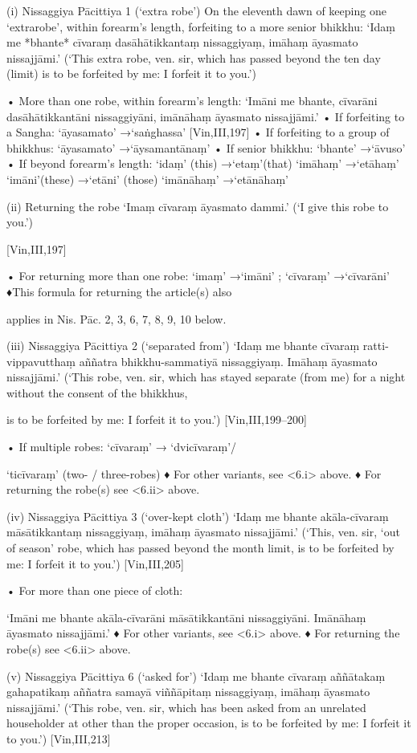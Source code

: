 (i) Nissaggiya Pācittiya 1 (‘extra robe’)
On the eleventh dawn of keeping one ‘extrarobe’, within forearm’s length, forfeiting to a
more senior bhikkhu:
‘Idaṃ me *bhante* cīvaraṃ dasāhātikkantaṃ
nissaggiyaṃ, imāhaṃ āyasmato nissajjāmi.’
(‘This extra robe, ven. sir, which has passed beyond the
ten day (limit) is to be forfeited by me: I forfeit it to you.’)

• More than one robe, within forearm’s
length:
‘Imāni me bhante, cīvarāni dasāhātikkantāni
nissaggiyāni, imānāhaṃ āyasmato nissajjāmi.’
• If forfeiting to a Sangha:
‘āyasamato’ →‘saṅghassa’ [Vin,III,197]
• If forfeiting to a group of bhikkhus:
‘āyasamato’ →‘āysamantānaṃ’
• If senior bhikkhu: ‘bhante’ →‘āvuso’
• If beyond forearm’s length:
‘idaṃ’ (this) →‘etaṃ’(that)
‘imāhaṃ’ →‘etāhaṃ’
‘imāni’(these) →‘etāni’ (those)
‘imānāhaṃ’ →‘etānāhaṃ’

(ii) Returning the robe
‘Imaṃ cīvaraṃ āyasmato dammi.’
(‘I give this robe to you.’)

[Vin,III,197]

• For returning more than one robe:
‘imaṃ’ →‘imāni’ ; ‘cīvaraṃ’ →‘cīvarāni’
♦This formula for returning the article(s) also

applies in Nis. Pāc. 2, 3, 6, 7, 8, 9, 10 below.

(iii) Nissaggiya Pācittiya 2 (‘separated from’)
‘Idaṃ me bhante cīvaraṃ ratti-vippavutthaṃ
aññatra bhikkhu-sammatiyā nissaggiyaṃ.
Imāhaṃ āyasmato nissajjāmi.’
(‘This robe, ven. sir, which has stayed separate (from
me) for a night without the consent of the bhikkhus,

is to be forfeited by me: I forfeit it to you.’)
[Vin,III,199–200]

• If multiple robes: ‘cīvaraṃ’ → ‘dvicīvaraṃ’/

‘ticīvaraṃ’ (two- / three-robes)
♦ For other variants, see <6.i> above.
♦ For returning the robe(s) see <6.ii> above.

(iv) Nissaggiya Pācittiya 3 (‘over-kept cloth’)
‘Idaṃ me bhante akāla-cīvaraṃ
māsātikkantaṃ nissaggiyaṃ,
imāhaṃ āyasmato nissajjāmi.’
(‘This, ven. sir, ‘out of season’ robe, which has
passed beyond the month limit, is to be forfeited
by me: I forfeit it to you.’)
[Vin,III,205]

• For more than one piece of cloth:

‘Imāni me bhante akāla-cīvarāni
māsātikkantāni nissaggiyāni.
Imānāhaṃ āyasmato nissajjāmi.’
♦ For other variants, see <6.i> above.
♦ For returning the robe(s) see <6.ii> above.

(v) Nissaggiya Pācittiya 6 (‘asked for’)
‘Idaṃ me bhante cīvaraṃ aññātakaṃ
gahapatikaṃ aññatra samayā viññāpitaṃ
nissaggiyaṃ, imāhaṃ āyasmato nissajjāmi.’
(‘This robe, ven. sir, which has been asked from an
unrelated householder at other than the proper
occasion, is to be forfeited by me: I forfeit it to you.’)
[Vin,III,213]

